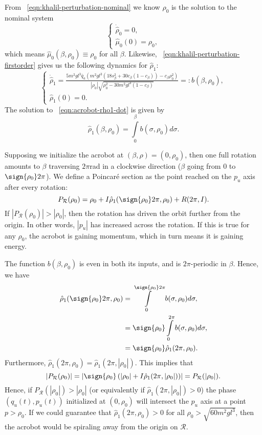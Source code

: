 From ~\eqref{eqn:khalil-perturbation-nominal} we know
\(\hat{\rho}_0\) is the solution to the nominal system
\[
    \begin{cases} 
        \dot{\hat{\rho}}_0 = 0
        , \\
        \hat{\mu}_0(0) = \rho_0
        ,
    \end{cases}
\]
which means \(\hat{\mu}_0(\beta,\rho_0) \equiv \rho_0\) for all \(\beta\).
Likewise, ~\eqref{eqn:khalil-perturbation-firstorder} 
gives us the following dynamics for \(\hat{\rho}_1\):
\begin{equation}\label{eqn:acrobot-rho1-dot}
  \begin{cases}
    \dot{\hat{\rho}}_1 =
    \frac{5m^2 g l^3 \bar{q}_a \left(
        m^2gl^3\left(18s_\beta^2 + 30c_\beta(1 - c_\beta)\right)
        - c_\beta\rho_0^2
    \right)}{
    |\rho_0|\sqrt{\rho_0^2 - 30m^2gl^3(1 - c_\beta)}
    }
    =: b(\beta,\rho_0)
     , \\
     \hat{\rho}_1(0) = 0
     .
 \end{cases}
\end{equation}
The solution to ~\eqref{eqn:acrobot-rho1-dot} is given by
\[
    \hat{\rho}_1(\beta,\rho_0) = \int \limits_0^\beta b(\sigma,\rho_0)d\sigma
    .
\]

Supposing we initialize the acrobot at \((\beta,\rho) = (0,\rho_0)\),
then one full rotation amounts to \(\beta\) traversing \(2\pi\)rad in a clockwise
direction (\ie \(\beta\) going from \(0\) to \(\sign{\rho_0}2\pi\)).
We define a Poincar\'{e} section as the point reached on the \(p_u\) axis after
every rotation:
\[
    P_\mathcal{R}(\rho_0) = \rho_0 + I \hat{\rho}_1(\sign{\rho_0}2\pi, \rho_0)
      + R(2\pi,I)
    .
\]
If \(|P_\mathcal{R}(\rho_0)| > |\rho_0|\), then the rotation has
driven the orbit further from the origin.
In other words, \(|p_u|\) has increased across the rotation.
If this is true for any \(\rho_0\), the acrobot is gaining momentum, which in
turn means it is gaining energy.

The function \(b(\beta,\rho_0)\) is even in both its inputs, and is 
\(2\pi\)-periodic in \(\beta\).
Hence, we have 
\begin{align*}
    \hat{\rho}_1(\sign{\rho_0}2\pi, \rho_0) &=
    \int \limits_0^{\sign{\rho_0}2\pi} b(\sigma,\rho_0)d\sigma
    , \\
     &=\sign{\rho_0}\int\limits_0^{2\pi}b(\sigma,\rho_0)d\sigma
     , \\
     &= \sign{\rho_0} \hat{\rho}_1(2\pi,\rho_0)
     .
\end{align*}
Furthermore, \(\hat{\rho}_1(2\pi,\rho_0) = \hat{\rho}_1(2\pi,|\rho_0|)\).
This implies that
\[
    |P_\mathcal{R}(\rho_0)| = \left|\sign{\rho_0}\left(
        |\rho_0| + I \hat{\rho}_1(2\pi,|\rho_0|)\right)
    \right|
    = P_\mathcal{R}(|\rho_0|)
    .
\]
Hence, if \(P_\mathcal{R}(|\rho_0|) > |\rho_0|\) (or equivalently if
\(\hat{\rho}_1(2\pi,|\rho_0|) > 0\))
the phase \((q_u(t),p_u(t))\) initialized at \((0,\rho_0)\) 
will intersect the \(p_u\) axis at a point \(p > \rho_0\).
If we could guarantee that \(\hat{\rho}_1(2\pi,\rho_0) > 0\)
for all \(\rho_0 > \sqrt{60m^2gl^3}\), then the acrobot would be spiraling away
from the origin on \(\mathcal{R}\).

